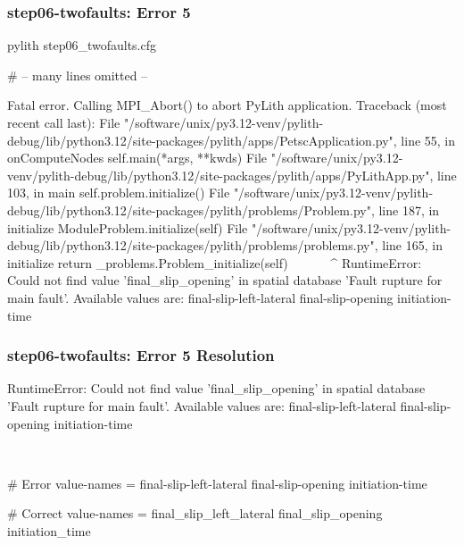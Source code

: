 \documentclass[aspectratio=169]{beamer}
\begin{document}
\begin{frame}[fragile]
  \frametitle{{\ttfamily step06-twofaults}: Error 5}

\begin{bashcode}
pylith step06_twofaults.cfg

# -- many lines omitted --

Fatal error. Calling MPI_Abort() to abort PyLith application.
Traceback (most recent call last):
  File "/software/unix/py3.12-venv/pylith-debug/lib/python3.12/site-packages/pylith/apps/PetscApplication.py", line 55, in onComputeNodes
    self.main(*args, **kwds)
  File "/software/unix/py3.12-venv/pylith-debug/lib/python3.12/site-packages/pylith/apps/PyLithApp.py", line 103, in main
    self.problem.initialize()
  File "/software/unix/py3.12-venv/pylith-debug/lib/python3.12/site-packages/pylith/problems/Problem.py", line 187, in initialize
    ModuleProblem.initialize(self)
  File "/software/unix/py3.12-venv/pylith-debug/lib/python3.12/site-packages/pylith/problems/problems.py", line 165, in initialize
    return _problems.Problem_initialize(self)
           ^^^^^^^^^^^^^^^^^^^^^^^^^^^^^^^^^^
RuntimeError: Could not find value 'final_slip_opening' in spatial database 'Fault rupture for main fault'. Available values are:
  final-slip-left-lateral
  final-slip-opening
  initiation-time
\end{bashcode}

\end{frame}


\begin{frame}[t,fragile]
  \frametitle{{\ttfamily step06-twofaults}: Error 5 Resolution}

  \tserror
  \begin{bashcode}
RuntimeError: Could not find value 'final_slip_opening' in spatial database 'Fault rupture for main fault'. Available values are:
  final-slip-left-lateral
  final-slip-opening
  initiation-time
  \end{bashcode}

  \pause\\[1pt]

  \begin{cfgcode}
    # Error
    value-names = final-slip-left-lateral  final-slip-opening  initiation-time

    # Correct
    value-names = final_slip_left_lateral  final_slip_opening  initiation_time
  \end{cfgcode}

\end{frame}
\end{document}
